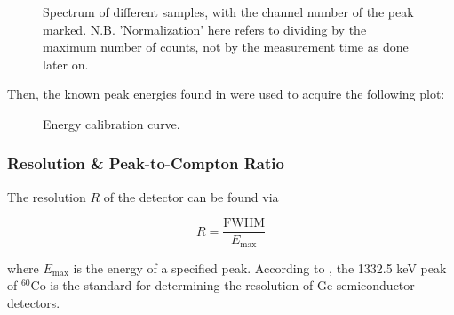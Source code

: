 \documentclass{article}
\begin{document}
\begin{figure}[h!]
	\centering
	\begin{subfigure}{0.45\textwidth}
		\centering
		\scalebox{0.5}{}
		\caption{}
		\label{fig:1}
	\end{subfigure}
	\begin{subfigure}{0.45\textwidth}
		\centering
		\scalebox{0.5}{}
		\caption{}
		\label{fig:2}
	\end{subfigure}
	\begin{subfigure}{0.45\textwidth}
		\centering
		\scalebox{0.5}{}
		\caption{}
		\label{fig:3}
	\end{subfigure}
	\begin{subfigure}{0.45\textwidth}
		\centering
		\scalebox{0.5}{}
		\caption{}
		\label{fig:4}
	\end{subfigure}
	\caption{Spectrum of different samples, with the channel number of the peak marked. N.B. 'Normalization' here refers to dividing by the maximum number of counts, not by the measurement time as done later on.}
	\label{fig:task1spectra}
\end{figure}

Then, the known peak energies found in \cite{plotzki_2024_highresolution} were used to acquire the following plot:

\begin{figure}[h!]
	\centering
	\scalebox{1}{}
	\caption{Energy calibration curve.}
	\label{fig:EnergyCalibration}
\end{figure}

\pagebreak{}

\subsubsection{Resolution \& Peak-to-Compton Ratio}

The resolution $R$ of the detector can be found via

\begin{equation}
	R = \frac{\text{FWHM}}{E_{\text{max}}}
\end{equation}

where $E_{\text{max}}$ is the energy of a specified peak. According to \cite{plotzki_2024_highresolution}, the 1332.5 keV peak of $^{60}$Co is the standard for determining the resolution of Ge-semiconductor detectors. 
\end{document}
